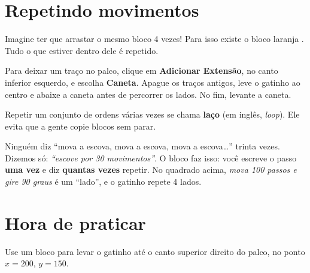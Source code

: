 \section{Repetindo movimentos}

Imagine ter que arrastar o mesmo bloco 4 vezes! Para isso existe o bloco laranja . Tudo o que estiver dentro dele é repetido.

Para deixar um traço no palco, clique em \textbf{Adicionar Extensão}, no canto inferior esquerdo, e escolha \textbf{Caneta}. Apague os traços antigos, leve o gatinho ao centro e abaixe a caneta antes de percorrer os lados. No fim, levante a caneta.

\begin{codigo}
\begin{pilha}
\sbcend
{}
\end{pilha}
\end{codigo}

\begin{vocabulario}
Repetir um conjunto de ordens várias vezes se chama \textbf{laço} (em inglês, \textit{loop}). Ele evita que a gente copie blocos sem parar.
\end{vocabulario}

\begin{pensaassim}
Ninguém diz ``mova a escova, mova a escova, mova a escova\ldots'' trinta vezes. Dizemos só: \emph{``escove por 30 movimentos''}. O bloco  faz isso: você escreve o passo \textbf{uma vez} e diz \textbf{quantas vezes} repetir. No quadrado acima, \emph{mova 100 passos e gire 90 graus} é um ``lado'', e o gatinho repete 4 lados.
\end{pensaassim}

\section{Hora de praticar}

\begin{exercicio}
Use um bloco para levar o gatinho até o canto superior direito do palco, no ponto $x=200$, $y=150$.
\end{exercicio}


